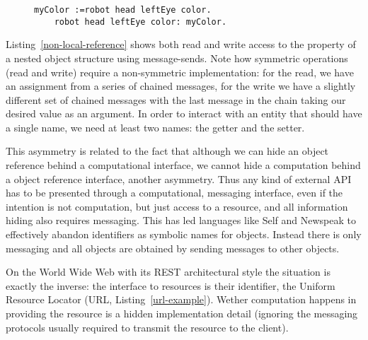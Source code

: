 \documentclass[preprint,authoryear]{acm_proc_article-sp}
\begin{document}

\begin{figure}[htbp]
\begin{lstlisting}[style=L,label=non-local-reference,caption=Accessing objects via chained message sends.]
	myColor :=robot head leftEye color.
	robot head leftEye color: myColor.
\end{lstlisting}
\end{figure}

Listing~\ref{non-local-reference} shows both read and write access to the property
of a nested object structure using message-sends.  Note how symmetric operations
(read and write) require a non-symmetric implementation:  for the read, we have an assignment
from a series of chained messages, for the write we have a slightly different set of 
chained messages with the last message in the chain taking our desired value
as an argument.  In order to interact with an entity that should have a single name,
we need at least two names:  the getter and the setter.

This asymmetry is related to the fact that although we can hide an object reference 
behind a computational interface, we cannot
hide a computation behind a object reference interface, another asymmetry.
Thus any kind of external API has to be presented through a computational, messaging 
interface, even if the intention is not computation, but just access to a resource,
  and all information hiding also requires messaging.  This has led languages
like Self \cite{UngarS87} and Newspeak \cite{newspeak} to effectively abandon identifiers as symbolic names for objects. Instead there is only messaging and
all objects are obtained by sending messages to other objects.

On the World Wide Web with its REST architectural style the situation is exactly the inverse: 
the interface to resources is their identifier, the Uniform Resource Locator (URL, Listing~\ref{url-example}).   Wether
computation happens in providing the resource is a hidden implementation detail
(ignoring the messaging protocols usually required to transmit the resource
to the client).  
\end{document}
